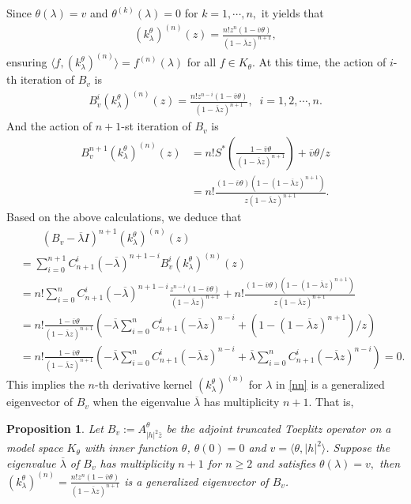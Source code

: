 \documentclass[12pt,reqno]{amsart}
\newtheorem{prop}[thm]{Proposition}
\theoremstyle{definition}
\theoremstyle{remark}
\numberwithin{equation}{section}
\newcommand{\la}{\langle}
\newcommand{\ra}{\rangle}
\newcommand{\ol}{\overline}
\begin{document}
Since $\theta(\lambda)=v$ and $\theta^{(k)}(\lambda)=0$ for $k=1,\cdots,n,$ it yields that
\begin{align}(k_\lambda^\theta)^{(n)}(z)=\frac{n!z^n
(1-\ol{v}\theta)}
{(1-\ol{\lambda}z)^{n+1}},\label{nn}\end{align} ensuring $\la f, (k_\lambda^\theta)^{(n)}\ra=f^{(n)}(\lambda)$ for all $f\in K_\theta.$ At this time, the action of $i$-th iteration of $B_v$ is
\begin{align*} B_v^{i}(k_\lambda^\theta)^{(n)}(z)=\frac{n!z^{n-i}(1-\ol{v}\theta)}
{(1-\ol{\lambda}z)^{n+1}},\;\;i=1, 2,\cdots, n. \end{align*} And the action of $n+1$-st iteration of $B_v$ is\begin{align*}B_v^{n+1}(k_\lambda^\theta)^{(n)}(z)&=
n!S^*\left(\frac{ 1-\ol{v}\theta }{(1-\ol{\lambda}z)^{n+1}} \right)+\ol{v}\theta/z\\&=n!\frac{(1-\ol{v}\theta)
(1-(1-\ol{\lambda}z)^{n+1})}{z(1-\ol{\lambda}z)^{n+1}}.\end{align*}
Based on the above calculations, we deduce that \begin{align*}&\quad\quad (B_v-\ol{\lambda}I)^{n+1}(k_\lambda^\theta)^{(n)}(z)\\&=
\sum_{i=0}^{n+1} C_{n+1}^i (-\ol{\lambda})^{n+1-i}B_v^{i}(k_\lambda^\theta)^{(n)}(z) \\&=n!\sum_{i=0}^{n } C_{n+1}^i (-\ol{\lambda})^{n+1-i}\frac{z^{n-i}(1-\ol{v}\theta)}
{(1-\ol{\lambda}z)^{n+1}}+n! \frac{(1-\ol{v}\theta)
(1-(1-\ol{\lambda}z)^{n+1})}{z(1-\ol{\lambda}z)^{n+1}}
\\&= n!\frac{1-\ol{v}\theta}{(1-\ol{\lambda}z)^{n+1}}\left(
-\ol{\lambda}\sum_{i=0}^{n} C_{n+1}^i  (-\ol{\lambda}z)^{n -i}
 + (1-(1-\ol{\lambda}z)^{n+1})/z \right)\\&=n!\frac{1-\ol{v}\theta}{(1-\ol{\lambda}z)^{n+1}} \left(
-\ol{\lambda}\sum_{i=0}^{n} C_{n+1}^i  (-\ol{\lambda}z)^{n -i}
 + \ol{\lambda}\sum_{i=0}^{n } C_{n+1}^i(-\ol{\lambda}z)^{n-i} \right)= 0.\end{align*}
This  implies the $n$-th derivative kernel $(k_{\lambda}^\theta)^{(n)}$ for $\lambda$ in \eqref{nn} is  a generalized eigenvector of $B_v$ when the eigenvalue $\ol{\lambda}$ has multiplicity $n+1$. That is,
\begin{prop}\label{prop ge} Let $B_v:=A_{|h|^2 \bar{z}}^\theta$ be the adjoint truncated Toeplitz operator on a model space $K_\theta$ with  inner function $\theta$, $\theta(0)=0$ and $v=\la \theta, |h|^2 \ra$. Suppose the eigenvalue $\ol{\lambda}$ of $B_v$ has multiplicity $n+1$
for $n\geq 2$ and satisfies $\theta(\lambda)=v,$ then $(k_{\lambda}^\theta)^{(n)}=\frac{n!z^n
(1-\ol{v}\theta)}
{(1-\ol{\lambda}z)^{n+1}}$  is  a generalized eigenvector of $B_v$. \end{prop}
\end{document}
